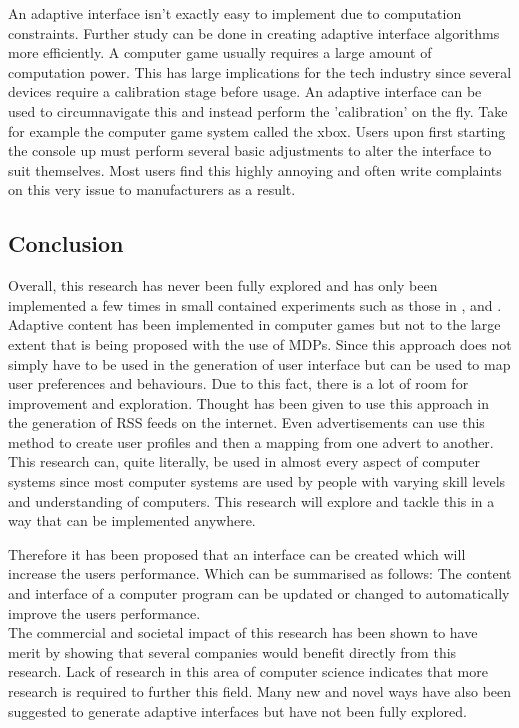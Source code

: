 \documentclass[11pt]{article}
\begin{document}
\vspace{6.0 mm}

An adaptive interface isn't exactly easy to implement due to computation constraints. Further study can be done in creating adaptive interface algorithms more efficiently. A computer game usually requires a large amount of computation power. This has large implications for the tech industry since several devices require a calibration stage before usage. An adaptive interface can be used to circumnavigate this and instead perform the 'calibration' on the fly. Take for example the computer game system called the xbox. Users upon first starting the console up must perform several basic adjustments to alter the interface to suit themselves. Most users find this highly annoying and often write complaints on this very issue to manufacturers as a result.
\vspace{6.0 mm}

\clearpage

\subsection{Conclusion}

Overall, this research has never been fully explored and has only been implemented a few times in small contained experiments such as those in \citep{andrade2005challenge}, \citep{ramamoorthy2013latent} and \citep{rosman2014user}. Adaptive content has been implemented in computer games but not to the large extent that is being proposed with the use of MDPs. Since this approach does not simply have to be used in the generation of user interface but can be used to map user preferences and behaviours. Due to this fact, there is a lot of room for improvement and exploration. Thought has been given to use this approach in the generation of RSS feeds on the internet. Even advertisements can use this method to create user profiles and then a mapping from one advert to another. This research can, quite literally, be used in almost every aspect of computer systems since most computer systems are used by people with varying skill levels and understanding of computers. This research will explore and tackle this in a way that can be implemented anywhere.
\vspace{6.0 mm}

Therefore it has been proposed that an interface can be created which will increase the users performance. Which can be summarised as follows:
 The content and interface of a computer program can be updated or changed to automatically improve the users performance.
\\
The commercial and societal impact of this research has been shown to have merit by showing that several companies would benefit directly from this research. Lack of research in this area of computer science indicates that more research is required to further this field. Many new and novel ways have also been suggested to generate adaptive interfaces but have not been fully explored.
\end{document}
